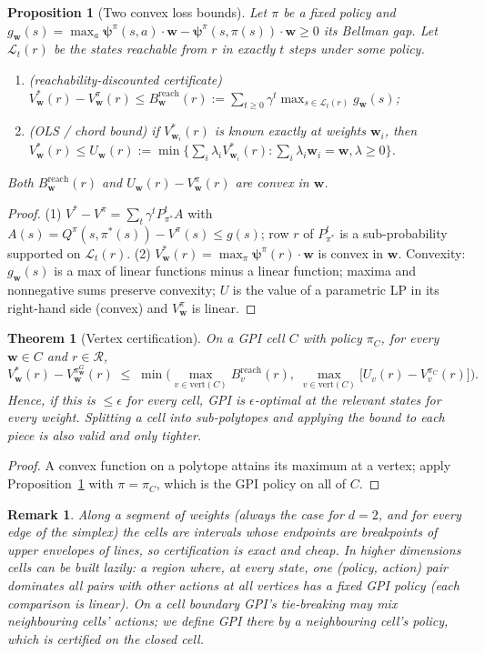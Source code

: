 \documentclass[11pt]{article}
\newcommand{\vpsi}{\bm{\psi}}
\newcommand{\w}{\mathbf{w}}
\newtheorem{theorem}{Theorem}
\newtheorem{proposition}{Proposition}
\newtheorem{remark}{Remark}
\begin{document}
\begin{proposition}[Two convex loss bounds]\label{prop:bounds}
Let $\pi$ be a fixed policy and $g_\w(s)=\max_a\vpsi^\pi(s,a)\cdot\w-\vpsi^\pi(s,\pi(s))\cdot\w\ge0$ its
Bellman gap. Let $\mathcal L_t(r)$ be the states reachable from $r$ in exactly $t$ steps under some policy.
\begin{enumerate}
\item (reachability-discounted certificate) $V^*_\w(r)-V^\pi_\w(r)\le
B^{\mathrm{reach}}_\w(r):=\sum_{t\ge0}\gamma^t\max_{s\in\mathcal L_t(r)}g_\w(s)$;
\item (OLS / chord bound) if $V^*_{\w_i}(r)$ is known exactly at weights $\w_i$, then
$V^*_\w(r)\le U_\w(r):=\min\{\sum_i\lambda_iV^*_{\w_i}(r):\sum_i\lambda_i\w_i=\w,\lambda\ge0\}$.
\end{enumerate}
Both $B^{\mathrm{reach}}_\w(r)$ and $U_\w(r)-V^\pi_\w(r)$ are convex in $\w$.
\end{proposition}
\begin{proof}
(1) $V^*-V^\pi=\sum_t\gamma^tP_{\pi^*}^tA$ with $A(s)=Q^\pi(s,\pi^*(s))-V^\pi(s)\le g(s)$; row $r$ of
$P_{\pi^*}^t$ is a sub-probability supported on $\mathcal L_t(r)$. (2) $V^*_\w(r)=\max_\pi\vpsi^\pi(r)\cdot\w$
is convex in $\w$. Convexity: $g_\w(s)$ is a max of linear functions minus a linear function; maxima and
nonnegative sums preserve convexity; $U$ is the value of a parametric LP in its right-hand side (convex) and
$V^\pi_\w$ is linear.
\end{proof}

\begin{theorem}[Vertex certification]\label{thm:vertex}
On a GPI cell $C$ with policy $\pi_C$, for every $\w\in C$ and $r\in\mathcal R$,
\[ V^*_\w(r)-V^{\pi^G_\w}_\w(r)\;\le\;\min\Big(\max_{v\in\mathrm{vert}(C)}B^{\mathrm{reach}}_v(r),\;
\max_{v\in\mathrm{vert}(C)}\big[U_v(r)-V^{\pi_C}_v(r)\big]\Big). \]
Hence, if this is $\le\epsilon$ for every cell, GPI is $\epsilon$-optimal at the relevant states for
\emph{every} weight. Splitting a cell into sub-polytopes and applying the bound to each piece is also valid
and only tighter.
\end{theorem}
\begin{proof}
A convex function on a polytope attains its maximum at a vertex; apply Proposition~\ref{prop:bounds} with
$\pi=\pi_C$, which is the GPI policy on all of $C$.
\end{proof}

\begin{remark}
Along a segment of weights (always the case for $d=2$, and for every edge of the simplex) the cells are
intervals whose endpoints are breakpoints of upper envelopes of lines, so certification is exact and cheap.
In higher dimensions cells can be built lazily: a region where, at every state, one (policy, action) pair
dominates all pairs with other actions at all vertices has a fixed GPI policy (each comparison is linear).
On a cell boundary GPI's tie-breaking may mix neighbouring cells' actions; we define GPI there by a
neighbouring cell's policy, which is certified on the closed cell.
\end{remark}
\end{document}
